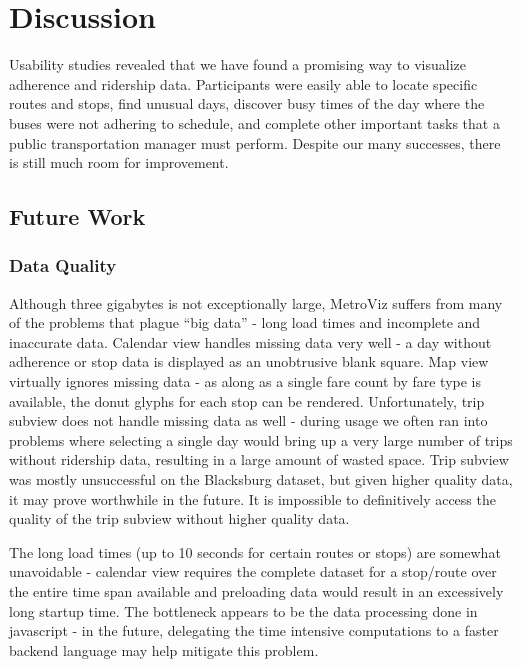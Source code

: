 \documentclass[journal]{vgtc}
\begin{document}
\section{Discussion}

Usability studies revealed that we have found a promising way to visualize adherence and ridership data. Participants were easily able to locate specific routes and stops, find unusual days, discover busy times of the day where the buses were not adhering to schedule, and complete other important tasks that a public transportation manager must perform. Despite our many successes, there is still much room for improvement. 

\subsection{Future Work}

\subsubsection{Data Quality}

Although three gigabytes is not exceptionally large, MetroViz suffers from many of the problems that plague ``big data'' - long load times and incomplete and inaccurate data. Calendar view handles missing data very well - a day without adherence or stop data is displayed as an unobtrusive blank square. Map view virtually ignores missing data - as along as a single fare count by fare type is available, the donut glyphs for each stop can be rendered. Unfortunately, trip subview does not handle missing data as well - during usage we often ran into problems where selecting a single day would bring up a very large number of trips without ridership data, resulting in a large amount of wasted space. Trip subview was mostly unsuccessful on the Blacksburg dataset, but given higher quality data, it may prove worthwhile in the future. It is impossible to definitively access the quality of the trip subview without higher quality data.

The long load times (up to 10 seconds for certain routes or stops) are somewhat unavoidable - calendar view requires the complete dataset for a stop/route over the entire time span available and preloading data would result in an excessively long startup time. The bottleneck appears to be the data processing done in javascript - in the future, delegating the time intensive computations to a faster backend language may help mitigate this problem.
\end{document}
